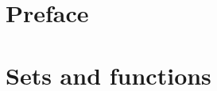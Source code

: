 \documentclass[prettycode]{watsonbook}
\begin{document}


\pagecolor{white} 

\newpage

\chapter*{Preface} \thispagestyle{empty}


\newpage

\tableofcontents

\newpage

\chapter{Sets and functions} \label{ch:sets-and-functions}
\end{document}
